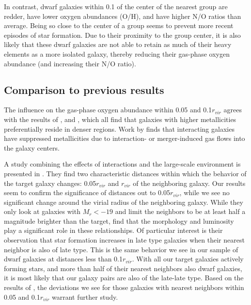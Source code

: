 In contrast, dwarf galaxies within 0.1 \hMpc of the center of the nearest group 
are redder, have lower oxygen abundances (O/H), and have higher N/O ratios than 
average.  Being so close to the center of a group seems to prevent more recent 
episodes of star formation.  Due to their proximity to the group center, it is 
also likely that these dwarf galaxies are not able to retain as much of their 
heavy elements as a more isolated galaxy, thereby reducing their gas-phase 
oxygen abundance (and increasing their N/O ratio).


\subsection{Comparison to previous results}

The influence on the gas-phase oxygen abundance within 0.05 \hMpc and 
0.1$r_{vir}$ agrees with the results of \cite{Shields91,Pustilnik06,Cooper08,
Ellison09,Pustilnik11a,Pustilnik14}, and \cite{SanchezAlmeida16}, which all find 
that galaxies with higher metallicities preferentially reside in denser regions.  
Work by \cite{Rupke08} finds that interacting galaxies have suppressed 
metallicities due to interaction- or merger-induced gas flows into the galaxy 
centers.

A study combining the effects of interactions and the large-scale environment is 
presented in \cite{Park09}.  They find two characteristic distances within which 
the behavior of the target galaxy changes: 0.05$r_{vir}$ and $r_{vir}$ of the 
neighboring galaxy.  Our results seem to confirm the significance of distances 
out to 0.05$r_{vir}$, while we see no significant change around the virial 
radius of the neighboring galaxy.  While they only look at galaxies with 
$M_r < -19$ and limit the neighbors to be at least half a magnitude brighter 
than the target, \cite{Park09} find that the morphology and luminosity play a 
significant role in these relationships.  Of particular interest is their 
observation that star formation increases in late type galaxies when their 
nearest neighbor is also of late type.  This is the same behavior we see in our 
sample of dwarf galaxies at distances less than 0.1$r_{vir}$.  With all our 
target galaxies actively forming stars, and more than half of their nearest 
neighbors also dwarf galaxies, it is most likely that our galaxy pairs are also 
of the late-late type.  Based on the results of \cite{Park09}, the deviations we 
see for those galaxies with nearest neighbors within 0.05 \hMpc and 
0.1$r_{vir}$ warrant further study.



